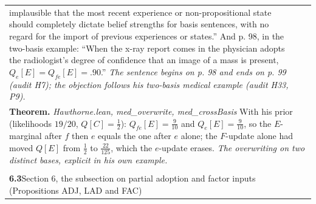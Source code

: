 \documentclass[10pt]{article}
\theoremstyle{definition}
\newlength{\fullw}\setlength{\fullw}{25.9cm}
\newcommand{\entryhead}[2]{\multicolumn{3}{|l|}{\rule{0pt}{2.6ex}\large\textbf{#1}\quad #2} \\ \hline}
\begin{document}
{\begin{longtable}{|p{0.9cm}|p{12.2cm}|p{12.2cm}|}
{implausible that the most recent experience or non-propositional state should
completely dictate belief strengths for basis sentences, with no regard for the
import of previous experiences or states.'' And p. 98, in the two-basis example:
``When the x-ray report comes in the physician adopts the radiologist's degree of
confidence that an image of a mass is present, $Q_e[E] = Q_{fe}[E] = .90$.'' \newline \textit{The sentence begins on p. 98 and ends on p. 99 (audit H7); the objection follows his two-basis medical example (audit H33, P9).}} \\
\multicolumn{3}{|p{\fullw}|}{\textbf{Theorem.} \textit{Hawthorne.lean, med\_overwrite, med\_crossBasis} \newline With his prior (likelihoods $19/20$, $Q[C]=\tfrac12$): $Q_{fe}[E]=\tfrac{9}{10}$
and $Q_e[E]=\tfrac{9}{10}$, so the $E$-marginal after $f$ then $e$ equals the one
after $e$ alone; the $F$-update alone had moved $Q[E]$ from $\tfrac12$ to
$\tfrac{22}{125}$, which the $e$-update erases. \newline \textit{The overwriting on two distinct bases, explicit in his own example.}} \\ \hline
\multicolumn{3}{|l|}{} \\ \hline
\entryhead{6.3}{Section 6, the subsection on partial adoption and factor inputs (Propositions ADJ, LAD and FAC)\quad{\footnotesize\textit{(formerly E.15)}}}

\end{longtable}}
\end{document}
